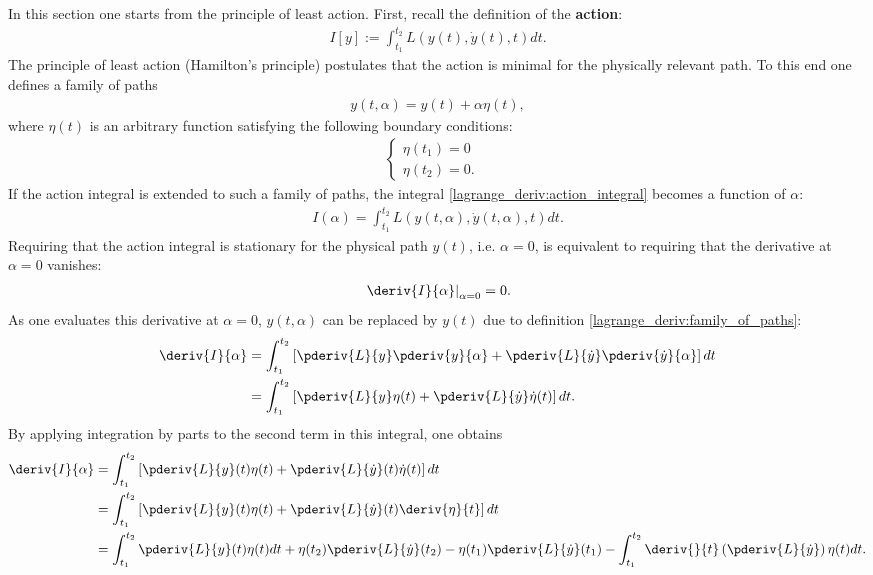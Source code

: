     In this section one starts from the principle of least action. First, recall the definition of the \textbf{action}:
    \begin{gather}
        \label{lagrange_deriv:action_integral}
        I[y] := \int_{t_1}^{t_2}L\left(y(t), \dot{y}(t), t\right)dt.
    \end{gather}
    The principle of least action (Hamilton's principle) postulates that the action is minimal for the physically relevant path. To this end one defines a family of paths
    \begin{gather}
        \label{lagrange_deriv:family_of_paths}
        y(t, \alpha) = y(t) + \alpha\eta(t),
    \end{gather}
    where $\eta(t)$ is an arbitrary function satisfying the following boundary conditions:
    \begin{gather}
        \begin{cases}
        \eta(t_1) = 0&\\
        \eta(t_2) = 0.&
        \end{cases}
    \end{gather}
    If the action integral is extended to such a family of paths, the integral \ref{lagrange_deriv:action_integral} becomes a function of $\alpha$:
    \begin{gather}
        \label{lagrange_deriv:action_integral_over_family}
        I(\alpha) = \int_{t_1}^{t_2}L\left(y(t,\alpha), \dot{y}(t, \alpha), t\right)dt.
    \end{gather}
    Requiring that the action integral is stationary for the physical path $y(t)$, i.e. $\alpha=0$, is equivalent to requiring that the derivative at $\alpha=0$ vanishes:
    \begin{gather}
        \label{lagrange_deriv:stationary_condition}
        \left.\deriv{I}{\alpha}\right|_{\alpha=0} = 0.
    \end{gather}
    As one evaluates this derivative at $\alpha = 0$, $y(t,\alpha)$ can be replaced by $y(t)$ due to definition \ref{lagrange_deriv:family_of_paths}:
    \begin{align}
        \deriv{I}{\alpha}&=\int_{t_1}^{t_2}\left[\pderiv{L}{y}\pderiv{y}{\alpha} + \pderiv{L}{\dot{y}}\pderiv{\dot{y}}{\alpha}\right]dt\nonumber\\
        &=\int_{t_1}^{t_2}\left[\pderiv{L}{y}\eta(t) + \pderiv{L}{\dot{y}}\dot{\eta}(t)\right]dt.
    \end{align}
    By applying integration by parts to the second term in this integral, one obtains
    \begin{align}
        \deriv{I}{\alpha}&=\int_{t_1}^{t_2}\left[\pderiv{L}{y}(t)\eta(t) + \pderiv{L}{\dot{y}}(t)\dot{\eta}(t)\right]dt\nonumber\\
        &=\int_{t_1}^{t_2}\left[\pderiv{L}{y}(t)\eta(t) + \pderiv{L}{\dot{y}}(t)\deriv{\eta}{t}\right]dt\nonumber\\
        &=\int_{t_1}^{t_2}\pderiv{L}{y}(t)\eta(t)dt + \eta(t_2)\pderiv{L}{\dot{y}}(t_2) - \eta(t_1)\pderiv{L}{\dot{y}}(t_1) - \int_{t_1}^{t_2}\deriv{}{t}\left(\pderiv{L}{\dot{y}}\right)\eta(t)dt.
    \end{align}
